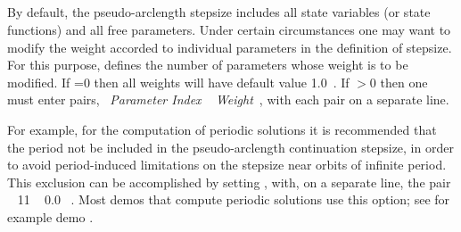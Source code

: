 \subsection{}  \label{sec:NTHL}


By default, the pseudo-arclength stepsize includes all state variables
(or state functions) and all free parameters.
Under certain circumstances one may want to modify the weight accorded 
to individual parameters in the definition of stepsize.
For this purpose,  defines the number of parameters whose weight 
is to be modified.
If =0 then all weights will have default value 1.0~.
If $>$0 then one must enter  pairs,
             ~{\it Parameter Index} ~ {\it Weight}~,
with each pair on a separate line.

For example, for the computation of periodic solutions it is 
recommended that the period not be included in the pseudo-arclength 
continuation stepsize, in order to avoid period-induced limitations 
on the stepsize near orbits of infinite period. 
This exclusion can be accomplished by setting , with, 
on a separate line, the pair ~ 11 ~ 0.0 ~.
Most demos that compute periodic solutions use this option;
see for example demo .

\subsection{}  \label{sec:NTHU}

